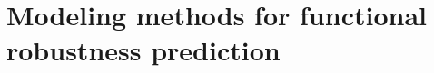 \chapter{Modeling methods for functional robustness prediction}

\label{sec:methods-operating-esd-analysis}



%
